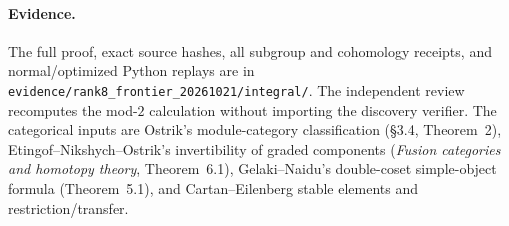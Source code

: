 \paragraph{Evidence.}
The full proof, exact source hashes, all subgroup and cohomology
receipts, and normal/optimized Python replays are in
\texttt{evidence/rank8\_frontier\_20261021/integral/}.
The independent review recomputes the mod-$2$ calculation without
importing the discovery verifier. The categorical inputs are Ostrik's
module-category classification (\S3.4, Theorem~2),
Etingof--Nikshych--Ostrik's invertibility of graded components
(\emph{Fusion categories and homotopy theory}, Theorem~6.1),
Gelaki--Naidu's double-coset simple-object formula (Theorem~5.1),
and Cartan--Eilenberg stable elements and restriction/transfer.
